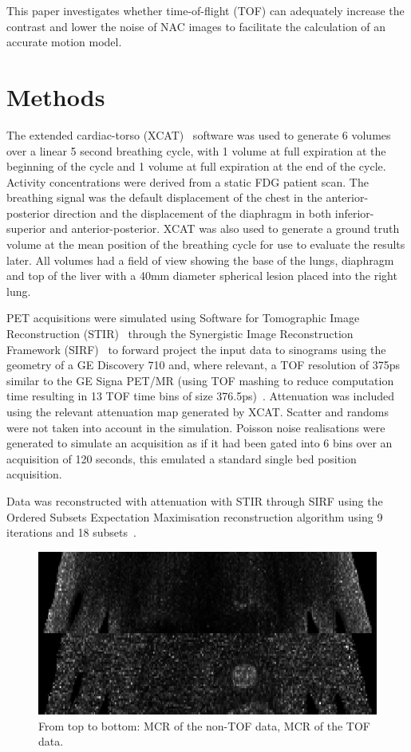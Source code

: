 \documentclass[9pt]{IEEEtran}
\begin{document}
This paper investigates whether time-of-flight (TOF) can adequately increase the contrast and lower the noise of  NAC images to facilitate the calculation of an accurate motion model.

\section{Methods}
The extended cardiac-torso (XCAT)~\cite{Segars2009} software was used to generate 6 volumes over a linear 5 second breathing cycle, with 1 volume at full expiration at the beginning of the cycle and 1 volume at full expiration at the end of the cycle. Activity concentrations were derived from a static FDG patient scan. The breathing signal was the default displacement of the chest in the anterior-posterior direction and the displacement of the diaphragm in both inferior-superior and anterior-posterior. XCAT was also used to generate a ground truth volume at the mean position of the breathing cycle for use to evaluate the results later. All volumes had a field of view showing the base of the lungs, diaphragm and top of the liver with a 40mm diameter spherical lesion placed into the right lung.

PET acquisitions were simulated using Software for Tomographic Image Reconstruction (STIR)~\cite{Thielemans2012} through the Synergistic Image Reconstruction Framework (SIRF)~\cite{Ovtchinnikov2017} to forward project the input data to sinograms using the geometry of a GE Discovery 710 and, where relevant, a TOF resolution of 375ps similar to the GE Signa PET/MR (using TOF mashing to reduce computation time resulting in 13 TOF time bins of size 376.5ps)~\cite{Efthimiou2017}. Attenuation was included using the relevant attenuation map generated by XCAT. Scatter and randoms were not taken into account in the simulation.
Poisson noise realisations were generated to simulate an acquisition as if it had been gated into 6 bins over an acquisition of 120 seconds, this emulated a standard single bed position acquisition.

Data was reconstructed with attenuation with STIR through SIRF using the Ordered Subsets Expectation Maximisation reconstruction algorithm using 9 iterations and 18 subsets~\cite{Hudson1994}. 

\begin{figure}
    \centering
    \includegraphics[scale=0.3]{figures/mcr.png}
    \caption{From top to bottom: MCR of the non-TOF data, MCR of the TOF data.}
    \label{fig:mcr}
\end{figure}
\end{document}
